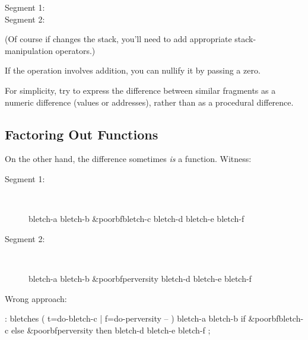 \begin{description}
\item[Segment 1:] 
\item[Segment 2:] 
\end{description}

\noindent 
(Of course if  changes the stack, you'll need to
add appropriate stack-manipulation operators.)

If the operation involves addition, you can nullify it by passing a
zero.

\begin{tip}
For simplicity, try to express the difference between similar
fragments as a numeric difference (values or addresses), rather than
as a procedural difference.
\end{tip}

\subsection{Factoring Out Functions}
On the other hand, the difference sometimes \emph{is} a function. Witness:

\begin{description}
\item[Segment 1:]~~
\begin{minipage}[t]{.6\hsize}
\begin{Code}[commandchars=\&\{\}]
bletch-a  bletch-b   &poorbf{bletch-c}
         bletch-d  bletch-e  bletch-f
\end{Code}
\end{minipage}
\item[Segment 2:]~~
\begin{minipage}[t]{.6\hsize}
\begin{Code}[commandchars=\&\{\}]
bletch-a  bletch-b  &poorbf{perversity}
         bletch-d  bletch-e  bletch-f
\end{Code}
\end{minipage}
\end{description}

\noindent Wrong approach:

\begin{Code}[commandchars=\&\{\}]
: bletches  ( t=do-bletch-c | f=do-perversity -- ) 
   bletch-a  bletch-b  if  &poorbf{bletch-c}  else  &poorbf{perversity}
      then  bletch-d bletch-e bletch-f ;
\end{Code}

